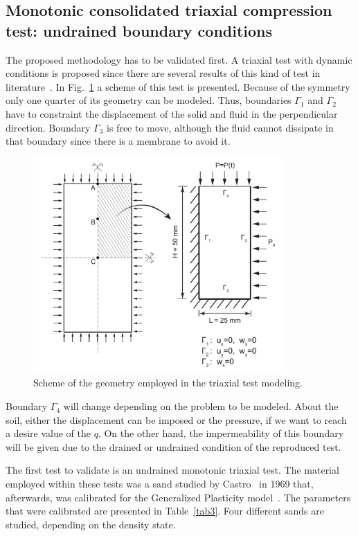 \documentclass[preprint,12pt,a4paper]{elsarticle}
\begin{document}
\subsection{Monotonic consolidated triaxial compression test: undrained boundary conditions}
\label{sec:41}
The proposed methodology has to be validated first. A triaxial test with dynamic conditions is proposed since there are several results of this kind of test in literature~\cite{PastorZC:90,Zienkiewicz99}. In Fig.~\ref{fig_Geo} a scheme of this test is presented. Because of the symmetry only one quarter of its geometry can be modeled. Thus, boundaries $\Gamma_1$ and $\Gamma_2$ have to constraint the displacement of the solid and fluid in the perpendicular direction. Boundary $\Gamma_3$ is free to move, although the fluid cannot dissipate in that boundary since there is a membrane to avoid it.

\begin{figure}
\centering
\includegraphics[width=0.85\textwidth]{Figs/Geo.pdf}
\caption{Scheme of the geometry employed in the triaxial test modeling.}
\label{fig_Geo}
\end{figure}

Boundary $\Gamma_4$ will change depending on the problem to be modeled. About the soil, either the displacement can be imposed or the pressure, if we want to reach a desire value of the $q$. On the other hand, the impermeability of this boundary will be given due to the drained or undrained condition of the reproduced test.

The first test to validate is an undrained monotonic triaxial test. The material employed within these tests was a sand studied by Castro~\cite{Castro69} in 1969 that, afterwards, was calibrated for the Generalized Plasticity model~\cite{PastorZC:90,Zienkiewicz99}. The parameters that were calibrated are presented in Table~\ref{tab3}. Four different sands are studied, depending on the density state.
\end{document}

